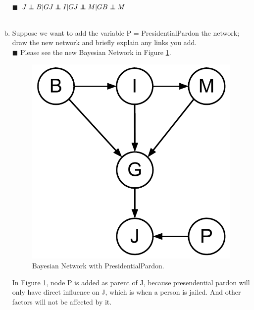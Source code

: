 \documentclass{article}
\newcommand{\solution}[1]{~\\ $\blacksquare$ \sffamily\upshape\selectfont #1
\normalfont ~\\~ }
\newcommand\independent{\protect\mathpalette{\protect\independenT}{\perp}}
\def\independenT#1#2{\mathrel{\rlap{$#1#2$}\mkern2mu{#1#2}}}
\begin{document}
\begin{enumerate}[a.]
  \solution{$
J\independent{B|G} \\
J\independent{I|G} \\
J\independent{M|G} \\
B\independent{M}
$}
\item Suppose we want to add the variable P =  PresidentialPardon the
network; draw the new network and briefly explain any links you add.
\solution{Please see the new Bayesian Network in Figure \ref{fig:14_14}.
  \begin{figure}[ht]
    \centering
    \includegraphics[width=.3\textwidth]{AI-HWK-2_14_14.pdf}
    \caption{Bayesian Network with PresidentialPardon.}\label{fig:14_14}
  \end{figure}
  In Figure \ref{fig:14_14}, node P is added as parent of J, because
  presendential pardon will only have direct influence on J, which is
  when a person is jailed. And other factors will not be affected by
  it. 
}
\end{enumerate}
\end{document}
